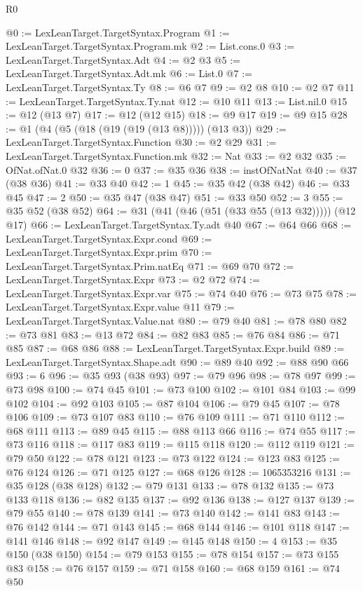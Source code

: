 \begin{lexlean}{R0}
\begin{coremodule}
@0 := LexLeanTarget.TargetSyntax.Program
@1 := LexLeanTarget.TargetSyntax.Program.mk
@2 := List.cons.{0}
@3 := LexLeanTarget.TargetSyntax.Adt
@4 := @2 @3
@5 := LexLeanTarget.TargetSyntax.Adt.mk
@6 := List.{0}
@7 := LexLeanTarget.TargetSyntax.Ty
@8 := @6 @7
@9 := @2 @8
@10 := @2 @7
@11 := LexLeanTarget.TargetSyntax.Ty.nat
@12 := @10 @11
@13 := List.nil.{0}
@15 := @12 (@13 @7)
@17 := @12 (@12 @15)
@18 := @9 @17
@19 := @9 @15
@28 := @1 (@4 (@5 (@18 (@19 (@19 (@13 @8))))) (@13 @3))
@29 := LexLeanTarget.TargetSyntax.Function
@30 := @2 @29
@31 := LexLeanTarget.TargetSyntax.Function.mk
@32 := Nat
@33 := @2 @32
@35 := OfNat.ofNat.{0} @32
@36 := 0
@37 := @35 @36
@38 := instOfNatNat
@40 := @37 (@38 @36)
@41 := @33 @40
@42 := 1
@45 := @35 @42 (@38 @42)
@46 := @33 @45
@47 := 2
@50 := @35 @47 (@38 @47)
@51 := @33 @50
@52 := 3
@55 := @35 @52 (@38 @52)
@64 := @31 (@41 (@46 (@51 (@33 @55 (@13 @32))))) (@12 @17)
@66 := LexLeanTarget.TargetSyntax.Ty.adt @40
@67 := @64 @66
@68 := LexLeanTarget.TargetSyntax.Expr.cond
@69 := LexLeanTarget.TargetSyntax.Expr.prim
@70 := LexLeanTarget.TargetSyntax.Prim.natEq
@71 := @69 @70
@72 := LexLeanTarget.TargetSyntax.Expr
@73 := @2 @72
@74 := LexLeanTarget.TargetSyntax.Expr.var
@75 := @74 @40
@76 := @73 @75
@78 := LexLeanTarget.TargetSyntax.Expr.value @11
@79 := LexLeanTarget.TargetSyntax.Value.nat
@80 := @79 @40
@81 := @78 @80
@82 := @73 @81
@83 := @13 @72
@84 := @82 @83
@85 := @76 @84
@86 := @71 @85
@87 := @68 @86
@88 := LexLeanTarget.TargetSyntax.Expr.build
@89 := LexLeanTarget.TargetSyntax.Shape.adt
@90 := @89 @40
@92 := @88 @90 @66
@93 := 6
@96 := @35 @93 (@38 @93)
@97 := @79 @96
@98 := @78 @97
@99 := @73 @98
@100 := @74 @45
@101 := @73 @100
@102 := @101 @84
@103 := @99 @102
@104 := @92 @103
@105 := @87 @104
@106 := @79 @45
@107 := @78 @106
@109 := @73 @107 @83
@110 := @76 @109
@111 := @71 @110
@112 := @68 @111
@113 := @89 @45
@115 := @88 @113 @66
@116 := @74 @55
@117 := @73 @116
@118 := @117 @83
@119 := @115 @118
@120 := @112 @119
@121 := @79 @50
@122 := @78 @121
@123 := @73 @122
@124 := @123 @83
@125 := @76 @124
@126 := @71 @125
@127 := @68 @126
@128 := 1065353216
@131 := @35 @128 (@38 @128)
@132 := @79 @131
@133 := @78 @132
@135 := @73 @133 @118
@136 := @82 @135
@137 := @92 @136
@138 := @127 @137
@139 := @79 @55
@140 := @78 @139
@141 := @73 @140
@142 := @141 @83
@143 := @76 @142
@144 := @71 @143
@145 := @68 @144
@146 := @101 @118
@147 := @141 @146
@148 := @92 @147
@149 := @145 @148
@150 := 4
@153 := @35 @150 (@38 @150)
@154 := @79 @153
@155 := @78 @154
@157 := @73 @155 @83
@158 := @76 @157
@159 := @71 @158
@160 := @68 @159
@161 := @74 @50

\end{coremodule}
\end{lexlean}

